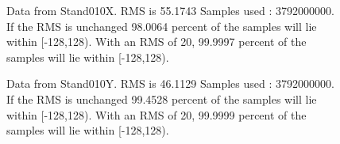 \begin{figure}[h] 				 				 				\caption{Data from Stand010X. RMS is 55.1743 Samples used : 3792000000. If the RMS is unchanged 98.0064 percent of the samples will lie within [-128,128).  				 With an RMS of 20, 99.9997 percent of the samples will lie within [-128,128).} 				\end{figure} 

\begin{figure}[h] 				 				 				\caption{Data from Stand010Y. RMS is 46.1129 Samples used : 3792000000. If the RMS is unchanged 99.4528 percent of the samples will lie within [-128,128).  				 With an RMS of 20, 99.9999 percent of the samples will lie within [-128,128).} 				\end{figure} 

